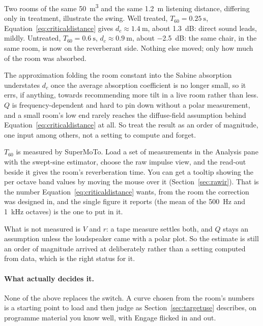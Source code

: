 Two rooms of the same \SI{50}{\cubic\metre} and the same \SI{1.2}{\metre} listening distance, differing only in treatment, illustrate the swing. Well treated, $T_{60}=\SI{0.25}{\second}$, Equation~\ref{eq:criticaldistance} gives $d_c\approx\SI{1.4}{\metre}$, about \SI{+1.3}{\dB}: direct sound leads, mildly. Untreated, $T_{60}=\SI{0.6}{\second}$, $d_c\approx\SI{0.9}{\metre}$, about \SI{-2.5}{\dB}: the same chair, in the same room, is now on the reverberant side. Nothing else moved; only how much of the room was absorbed.

The approximation folding the room constant into the Sabine absorption understates $d_c$ once the average absorption coefficient is no longer small, so it errs, if anything, towards recommending more tilt in a live room rather than less. $Q$ is frequency-dependent and hard to pin down without a polar measurement, and a small room's low end rarely reaches the diffuse-field assumption behind Equation~\ref{eq:criticaldistance} at all. So treat the result as an order of magnitude, one input among others, not a setting to compute and forget.

$T_{60}$ is measured by SuperMoTo. Load a set of measurements in the Analysis pane with the swept-sine estimator, choose the raw impulse view, and the read-out beside it gives the room's reverberation time. You can get a tooltip showing the per octave band values by moving the mouse over it (Section~\ref{sec:rawir}). That is the number Equation~\ref{eq:criticaldistance} wants, from the room the correction was designed in, and the single figure it reports (the mean of the \SI{500}{\hertz} and \SI{1}{\kilo\hertz} octaves) is the one to put in it.

What is not measured is $V$ and $r$: a tape measure settles both, and $Q$ stays an assumption unless the loudspeaker came with a polar plot. So the estimate is still an order of magnitude arrived at deliberately rather than a setting computed from data, which is the right status for it.

\paragraph{What actually decides it.} None of the above replaces the switch. A curve chosen from the room's numbers is a starting point to load and then judge as Section~\ref{sec:targetuse} describes, on programme material you know well, with Engage flicked in and out.

